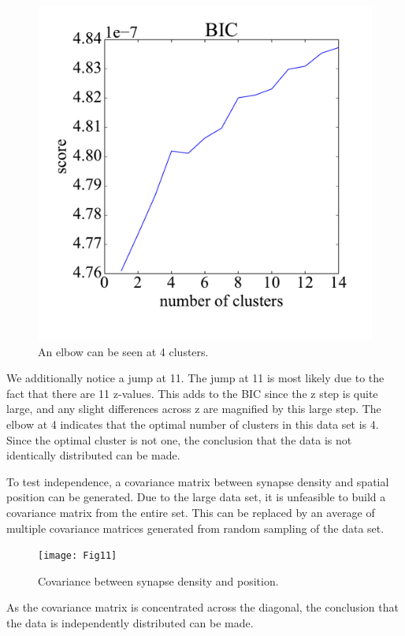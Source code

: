 \documentclass{article}
\begin{document}
\begin{figure}[h]
  \centering
  \includegraphics[scale = .3]{Fig10}
  \caption{An elbow can be seen at 4 clusters.}
\end{figure}

We additionally notice a jump at 11. The jump at 11 is most likely due to the fact that there are 11 z-values. This adds to the BIC since the z step is quite large, and any slight differences across z are magnified by this large step. The elbow at 4 indicates that the optimal number of clusters in this data set is 4. Since the optimal cluster is not one, the conclusion that the data is not identically distributed can be made.

To test independence, a covariance matrix between synapse density and spatial position can be generated. Due to the large data set, it is unfeasible to build a covariance matrix from the entire set. This can be replaced by an average of multiple covariance matrices generated from random sampling of the data set.

\begin{figure}[h]
  \centering
  \texttt{[image: Fig11]}
  \caption{Covariance between synapse density and position.}
\end{figure}

As the covariance matrix is concentrated across the diagonal, the conclusion that the data is independently distributed can be made.
\end{document}
